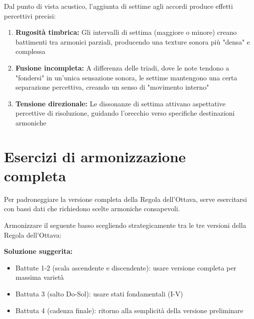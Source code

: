\begin{fisica}
	Dal punto di vista acustico, l'aggiunta di settime agli accordi produce effetti percettivi precisi:
	
	\begin{enumerate}
		\item \textbf{Rugosità timbrica:} Gli intervalli di settima (maggiore o minore) creano battimenti tra armonici parziali, producendo una texture sonora più "densa" e complessa
		
		\item \textbf{Fusione incompleta:} A differenza delle triadi, dove le note tendono a "fondersi" in un'unica sensazione sonora, le settime mantengono una certa separazione percettiva, creando un senso di "movimento interno"
		
		\item \textbf{Tensione direzionale:} Le dissonanze di settima attivano aspettative percettive di risoluzione, guidando l'orecchio verso specifiche destinazioni armoniche
	\end{enumerate}
\end{fisica}

\section{Esercizi di armonizzazione completa}
\label{sec:esercizi_armonizzazione}

Per padroneggiare la versione completa della Regola dell'Ottava, serve esercitarsi con bassi dati che richiedono scelte armoniche consapevoli.

\begin{esempio}
	\label{ex:basso_dato_misto}
	
	Armonizzare il seguente basso scegliendo strategicamente tra le tre versioni della Regola dell'Ottava:
	
	
	\textbf{Soluzione suggerita:}
	\begin{itemize}
		\item Battute 1-2 (scala ascendente e discendente): usare versione completa per massima varietà
		\item Battuta 3 (salto Do-Sol): usare stati fondamentali (I-V)
		\item Battuta 4 (cadenza finale): ritorno alla semplicità della versione preliminare
	\end{itemize}
\end{esempio}

